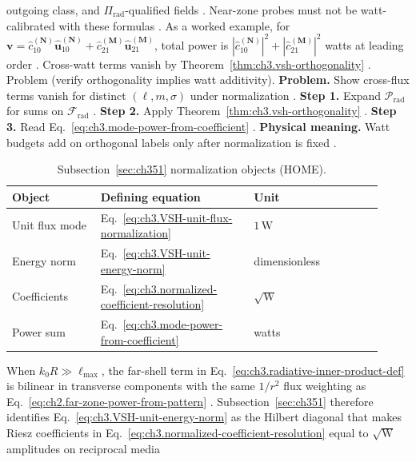 outgoing class, and \(\Pi_{\mathrm{rad}}\)-qualified fields \cite{harrington2001}. Near-zone probes must
not be watt-calibrated with these formulas \cite{harrington2001}.
As a worked example, for \(\mathbf{v}=\widehat{c}_{10}^{(\mathbf{N})}\widehat{\mathbf{u}}_{10}^{(\mathbf{N})}
+\widehat{c}_{21}^{(\mathbf{M})}\widehat{\mathbf{u}}_{21}^{(\mathbf{M})}\), total power is
\(|\widehat{c}_{10}^{(\mathbf{N})}|^{2}+|\widehat{c}_{21}^{(\mathbf{M})}|^{2}\) watts at leading order
\cite{stratton1941}. Cross-watt terms vanish by Theorem~\ref{thm:ch3.vsh-orthogonality} \cite{hansen1988}.
Problem (verify orthogonality implies watt additivity). \textbf{Problem.} Show cross-flux terms vanish for distinct \((\ell,m,\sigma)\) under normalization
\cite{stratton1941}.
\textbf{Step 1.} Expand \(\mathcal{P}_{\mathrm{rad}}\) for sums on \(\mathcal{F}_{\mathrm{rad}}\) \cite{poynting1884}.
\textbf{Step 2.} Apply Theorem~\ref{thm:ch3.vsh-orthogonality} \cite{hansen1988}.
\textbf{Step 3.} Read Eq.~\eqref{eq:ch3.mode-power-from-coefficient} \cite{harrington2001}.
\textbf{Physical meaning.} Watt budgets add on orthogonal labels only after normalization is fixed
\cite{stratton1941}.
\begin{table}[t]
\centering
\caption{Subsection~\ref{sec:ch351} normalization objects (HOME).}
\label{tab:ch3.351-normalization-objects}
\small
\begin{tabular}{@{}p{0.22\linewidth}p{0.38\linewidth}p{0.32\linewidth}@{}}
\toprule
Object & Defining equation & Unit \\
\midrule
Unit flux mode & Eq.~\eqref{eq:ch3.VSH-unit-flux-normalization} & \(1\,\mathrm{W}\) \\
Energy norm & Eq.~\eqref{eq:ch3.VSH-unit-energy-norm} & dimensionless \\
Coefficients & Eq.~\eqref{eq:ch3.normalized-coefficient-resolution} & \(\sqrt{\mathrm{W}}\) \\
Power sum & Eq.~\eqref{eq:ch3.mode-power-from-coefficient} & watts \\
\bottomrule
\end{tabular}
\end{table}
When \(k_{0}R\gg\ell_{\max}\), the far-shell term in Eq.~\eqref{eq:ch3.radiative-inner-product-def} is bilinear in
transverse components with the same \(1/r^{2}\) flux weighting as Eq.~\eqref{eq:ch2.far-zone-power-from-pattern}
\cite{stratton1941}. Subsection~\ref{sec:ch351} therefore identifies
Eq.~\eqref{eq:ch3.VSH-unit-energy-norm} as the Hilbert diagonal that makes Riesz coefficients in
Eq.~\eqref{eq:ch3.normalized-coefficient-resolution} equal to \(\sqrt{\mathrm{W}}\) amplitudes on reciprocal media
